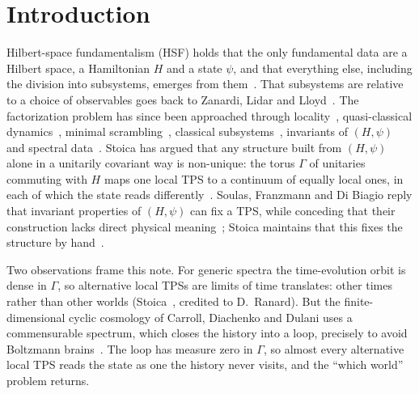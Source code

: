 \documentclass[11pt]{article}
\theoremstyle{definition}
\theoremstyle{remark}
\begin{document}
\section{Introduction}
\label{sec:intro}

Hilbert-space fundamentalism (HSF) holds that the only fundamental data are a Hilbert space, a Hamiltonian $H$ and a state $\psi$, and that everything else, including the division into subsystems, emerges from them~\cite{CarrollSingh2021,Stoica2022}. That subsystems are relative to a choice of observables goes back to Zanardi, Lidar and Lloyd~\cite{ZLL2004}. The factorization problem has since been approached through locality~\cite{CPR2019}, quasi-classical dynamics~\cite{CarrollSingh2021}, minimal scrambling~\cite{Zanardi2024}, classical subsystems~\cite{Adil2024}, invariants of $(H,\psi)$~\cite{Soulas2025} and spectral data~\cite{LoizeauSels2024,Cao2026,Kushwaha2026}.
Stoica has argued that any structure built from $(H,\psi)$ alone in a unitarily covariant way is non-unique: the torus $\Gamma$ of unitaries commuting with $H$ maps one local TPS to a continuum of equally local ones, in each of which the state reads differently~\cite{Stoica2022,Stoica2024,Stoica2026}. Soulas, Franzmann and Di Biagio reply that invariant properties of $(H,\psi)$ can fix a TPS, while conceding that their construction lacks direct physical meaning~\cite{Soulas2025}; Stoica maintains that this fixes the structure by hand~\cite{Stoica2026comment}.

Two observations frame this note. For generic spectra the time-evolution orbit is dense in $\Gamma$, so alternative local TPSs are limits of time translates: other times rather than other worlds (Stoica~\cite[Remark~11]{Stoica2022}, credited to D.~Ranard). But the finite-dimensional cyclic cosmology of Carroll, Diachenko and Dulani uses a commensurable spectrum, which closes the history into a loop, precisely to avoid Boltzmann brains~\cite{CDD2026}. The loop has measure zero in $\Gamma$, so almost every alternative local TPS reads the state as one the history never visits, and the ``which world'' problem returns.
\end{document}
